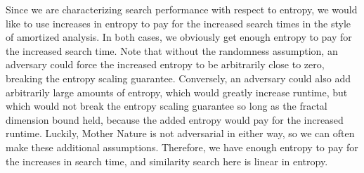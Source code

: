 \documentclass{amsbook}
\theoremstyle{definition}
\theoremstyle{remark}
\numberwithin{equation}{section}
\begin{document}
Since we are characterizing search performance with respect to entropy, we would like to use increases in entropy to pay for the increased search times in the style of amortized analysis.
In both cases, we obviously get enough entropy to pay for the increased search time.
Note that without the randomness assumption, an adversary could force the increased entropy to be arbitrarily close to zero, breaking the entropy scaling guarantee.
Conversely, an adversary could also add arbitrarily large amounts of entropy, which would greatly increase runtime, but which would not break the entropy scaling guarantee so long as the fractal dimension bound held, because the added entropy would pay for the increased runtime.
Luckily, Mother Nature is not adversarial in either way, so we can often make these additional assumptions. 
Therefore, we have enough entropy to pay for the increases in search time, and similarity search here is linear in entropy.
\end{document}
